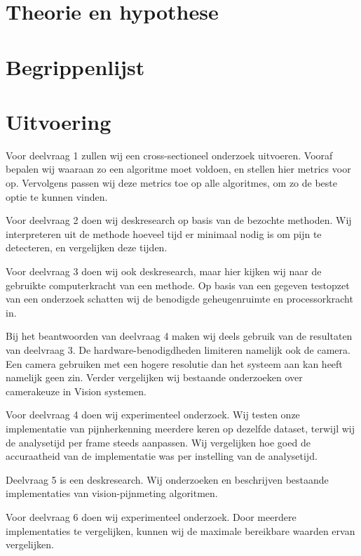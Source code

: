 \documentclass[11pt]{article}
\begin{document}
    \section{Theorie en hypothese}


    \section{Begrippenlijst}


    \section{Uitvoering}
    Voor deelvraag 1 zullen wij een cross-sectioneel onderzoek uitvoeren.
    Vooraf bepalen wij waaraan zo een algoritme moet voldoen, en stellen hier metrics voor op.
    Vervolgens passen wij deze metrics toe op alle algoritmes, om zo de beste optie te kunnen vinden.

    Voor deelvraag 2 doen wij deskresearch op basis van de bezochte methoden.
    Wij interpreteren uit de methode hoeveel tijd er minimaal nodig is om pijn te detecteren, en vergelijken deze tijden.

    Voor deelvraag 3 doen wij ook deskresearch, maar hier kijken wij naar de gebruikte computerkracht van een methode.
    Op basis van een gegeven testopzet van een onderzoek schatten wij de benodigde geheugenruimte en processorkracht in.

    Bij het beantwoorden van deelvraag 4 maken wij deels gebruik van de resultaten van deelvraag 3.
    De hardware-benodigdheden limiteren namelijk ook de camera.
    Een camera gebruiken met een hogere resolutie dan het systeem aan kan heeft namelijk geen zin.
    Verder vergelijken wij bestaande onderzoeken over camerakeuze in Vision systemen.

    Voor deelvraag 4 doen wij experimenteel onderzoek.
    Wij testen onze implementatie van pijnherkenning meerdere keren op dezelfde dataset, terwijl wij de analysetijd per frame steeds aanpassen.
    Wij vergelijken hoe goed de accuraatheid van de implementatie was per instelling van de analysetijd.

    Deelvraag 5 is een deskresearch.
    Wij onderzoeken en beschrijven bestaande implementaties van vision-pijnmeting algoritmen.

    Voor deelvraag 6 doen wij experimenteel onderzoek.
    Door meerdere implementaties te vergelijken, kunnen wij de maximale bereikbare waarden ervan vergelijken.
\end{document}
